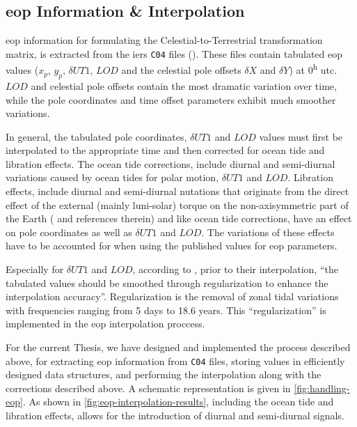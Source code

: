 \subsection{\gls{eop} Information \& Interpolation}\label{ssec:eop-interpolation}

\Gls{eop} information for formulating the Celestial-to-Terrestrial transformation 
matrix, is extracted from the \gls{iers} \texttt{C04} files (\cite{Bizouard2019}).
These files contain tabulated \gls{eop} values ($x_p$, $y_p$, $\delta UT1$, $LOD$ and 
the celestial pole offsets $\delta X$ and $\delta Y$) at 0\textsuperscript{h} \gls{utc}. 
$LOD$ and celestial pole offsets contain the most dramatic variation over time, while 
the pole coordinates and time offset parameters exhibit much smoother variations.

In general, the tabulated pole coordinates, $\delta UT1$ and $LOD$ values must first 
be interpolated to the appropriate time and then corrected for ocean tide and 
libration effects. The ocean tide corrections, include diurnal and semi-diurnal 
variations caused by ocean tides for polar motion, $\delta UT1$ and $LOD$. Libration effects, 
include diurnal and semi-diurnal nutations that originate from the direct effect 
of the external (mainly luni-solar) torque on the non-axisymmetric part of the Earth 
(\cite{iers2010} and references therein) and like ocean tide corrections, have an effect on 
pole coordinates as well as $\delta UT1$ and $LOD$. The variations of these effects 
have to be accounted for when using the published values for \gls{eop} parameters.

Especially for $\delta UT1$ and $LOD$, according to \cite{Bradley2016}, 
prior to their interpolation, ``the tabulated values should be smoothed through regularization 
to enhance the interpolation accuracy''. Regularization is the removal of zonal tidal 
variations with frequencies ranging from 5 days to 18.6 years. This ``regularization'' is 
implemented in the \gls{eop} interpolation proccess.

For the current Thesis, we have designed and implemented the process described above, for 
extracting \gls{eop} information from \texttt{C04} files, storing values in efficiently designed 
data structures, and performing the interpolation along with the corrections described above.
A schematic representation is given in \ref{fig:handling-eop}. As shown in \ref{fig:eop-interpolation-results}, 
including the ocean tide and libration effects, allows for the introduction of diurnal and 
semi-diurnal signals.

